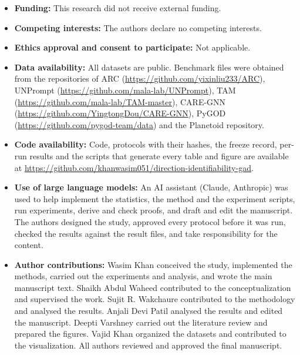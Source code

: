 \documentclass[pdflatex,sn-mathphys-ay]{sn-jnl}
\theoremstyle{plain}
\theoremstyle{remark}
\begin{document}
\begin{itemize}
\item \textbf{Funding:} This research did not receive external funding.
\item \textbf{Competing interests:} The authors declare no competing interests.
\item \textbf{Ethics approval and consent to participate:} Not applicable.
\item \textbf{Data availability:} All datasets are public. Benchmark files were obtained from the repositories of ARC (\url{https://github.com/yixinliu233/ARC}), UNPrompt (\url{https://github.com/mala-lab/UNPrompt}), TAM (\url{https://github.com/mala-lab/TAM-master}), CARE-GNN (\url{https://github.com/YingtongDou/CARE-GNN}), PyGOD (\url{https://github.com/pygod-team/data}) and the Planetoid repository.
\item \textbf{Code availability:} Code, protocols with their hashes, the freeze record, per-run results and the scripts that generate every table and figure are available at \url{https://github.com/khanwasim051/direction-identifiability-gad}.
\item \textbf{Use of large language models:} An AI assistant (Claude, Anthropic) was used to help implement the statistics, the method and the experiment scripts, run experiments, derive and check proofs, and draft and edit the manuscript. The authors designed the study, approved every protocol before it was run, checked the results against the result files, and take responsibility for the content.
\item \textbf{Author contributions:} Wasim Khan conceived the study, implemented the methods, carried out the experiments and analysis, and wrote the main manuscript text. Shaikh Abdul Waheed contributed to the conceptualization and supervised the work. Sujit R. Wakchaure contributed to the methodology and analysed the results. Anjali Devi Patil analysed the results and edited the manuscript. Deepti Varshney carried out the literature review and prepared the figures. Vajid Khan organized the datasets and contributed to the visualization. All authors reviewed and approved the final manuscript.
\end{itemize}
\end{document}
